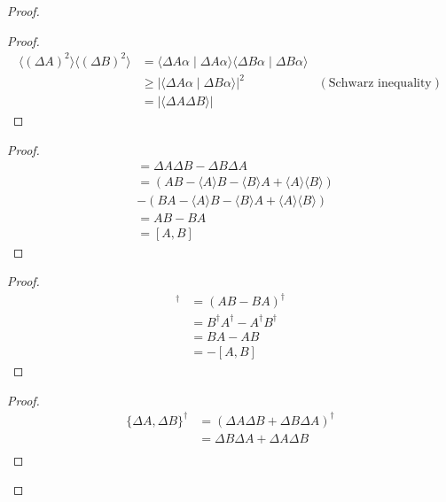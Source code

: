 \documentclass{book}
\theoremstyle{definition}
\begin{document}
\begin{proof}
\pf
{}
\begin{proof}
\pf
\begin{align*}
	\langle (\Delta A)^2 \rangle \langle (\Delta B)^2 \rangle
	& = \langle \Delta A \alpha \mid \Delta A \alpha \rangle \langle \Delta B \alpha \mid \Delta B \alpha \rangle \\
	& \geq |\langle \Delta A \alpha \mid \Delta B \alpha \rangle|^2 & (\text{Schwarz inequality}) 	\\
	& = |\langle \Delta A \Delta B \rangle|
\end{align*}
\end{proof}
\begin{proof}
	\pf
	\begin{align*}
		[\Delta A, \Delta B] & = \Delta A \Delta B - \Delta B \Delta A \\
		& = (AB - \langle A \rangle B - \langle B \rangle A + \langle A \rangle \langle B \rangle) \\
		& - (BA - \langle A \rangle B - \langle B \rangle A + \langle A \rangle \langle B \rangle) \\
		& = AB - BA \\
		& = [A,B]
	\end{align*}
\end{proof}
\begin{proof}
	\pf
	\begin{align*}
		[A,B]^\dagger & = (AB - BA)^\dagger \\
		& = B^\dagger A^\dagger - A^\dagger B^\dagger \\
		&= BA - AB \\
		& = -[A,B]
	\end{align*}
\end{proof}
\begin{proof}
	\pf
	\begin{align*}
		\{ \Delta A, \Delta B \}^\dagger
		& = (\Delta A \Delta B + \Delta B \Delta A)^\dagger \\
		& = \Delta B \Delta A + \Delta A \Delta B \\

\end{align*}
\end{proof}
\end{proof}
\end{document}
